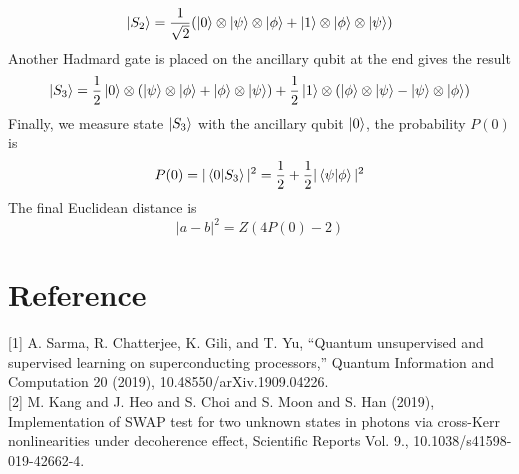 \documentclass{article}
\begin{document}
\begin{equation}
    \ket{S_2}=\frac{1}{\sqrt{2}}(\ket{0}\otimes\ket{\psi}\otimes\ket{\phi}+\ket{1}\otimes\ket{\phi}\otimes\ket{\psi})
\end{equation}
Another Hadmard gate is placed on the ancillary qubit at the end gives the result
\begin{equation}
    \ket{S_3}=\frac{1}{2}\ket{0}\otimes(\ket{\psi}\otimes\ket{\phi}+\ket{\phi}\otimes\ket{\psi})+\frac{1}{2}\ket{1}\otimes(\ket{\phi}\otimes\ket{\psi}-\ket{\psi}\otimes\ket{\phi})
\end{equation}
Finally, we measure state $\ket{S_3}$ with the ancillary qubit $\ket{0}$, the probability $P(0)$ is 
\begin{equation}
    P(0)=|\bra{0}\ket{S_3}|^2=\frac{1}{2}+\frac{1}{2}|\bra{\psi}\ket{\phi}|^2
\end{equation}
The final Euclidean distance is
\begin{equation}
    |a-b|^2=Z(4P(0)-2)
\end{equation}


\section*{Reference}
[1] A. Sarma, R. Chatterjee, K. Gili, and T. Yu, “Quantum unsupervised and supervised learning on superconducting processors,” Quantum Information and Computation 20 (2019), 10.48550/arXiv.1909.04226.\\

[2] M. Kang and J. Heo and S. Choi and S. Moon and S. Han (2019), Implementation of SWAP test for two unknown states in photons via cross-Kerr nonlinearities under decoherence effect, Scientific Reports Vol. 9., 10.1038/s41598-019-42662-4.
\end{document}
